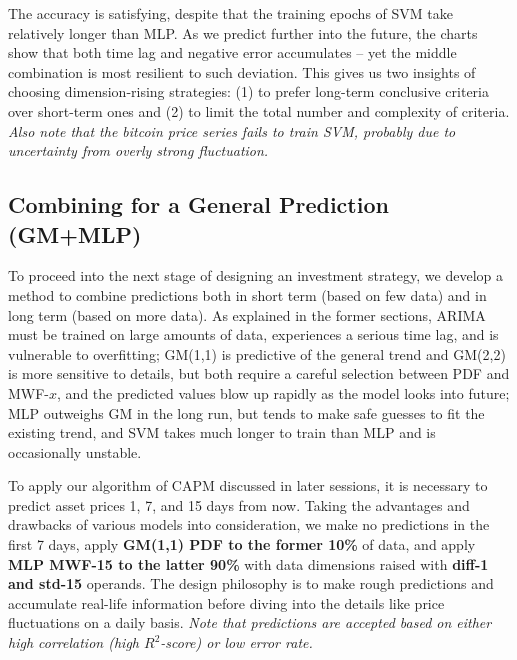 \documentclass{mcmthesis}
\begin{document}
	The accuracy is satisfying, despite that the training epochs of SVM take relatively longer than MLP. As we predict further into the future, the charts show that both time lag and negative error accumulates -- yet the middle combination is most resilient to such deviation. This gives us two insights of choosing dimension-rising strategies: (1) to prefer long-term conclusive criteria over short-term ones and (2) to limit the total number and complexity of criteria. \textit{Also note that the bitcoin price series fails to train SVM, probably due to uncertainty from overly strong fluctuation. }
	
	\subsection{Combining for a General Prediction (GM+MLP)}
	\label{sec:3.4}
	
	To proceed into the next stage of designing an investment strategy, we develop a method to combine predictions both in short term (based on few data) and in long term (based on more data). As explained in the former sections, ARIMA must be trained on large amounts of data, experiences a serious time lag, and is vulnerable to overfitting; GM(1,1) is predictive of the general trend and GM(2,2) is more sensitive to details, but both require a careful selection between PDF and MWF-$x$, and the predicted values blow up rapidly as the model looks into future; MLP outweighs GM in the long run, but tends to make safe guesses to fit the existing trend, and SVM takes much longer to train than MLP and is occasionally unstable. 
	
	To apply our algorithm of CAPM discussed in later sessions, it is necessary to predict asset prices 1, 7, and 15 days from now. Taking the advantages and drawbacks of various models into consideration, we make no predictions in the first 7 days, apply \textbf{GM(1,1) PDF to the former 10\%} of data, and apply \textbf{MLP MWF-15 to the latter 90\%} with data dimensions raised with \textbf{diff-1 and std-15} operands. The design philosophy is to make rough predictions and accumulate real-life information before diving into the details like price fluctuations on a daily basis. \textit{Note that predictions are accepted based on either high correlation (high $R^2$-score) or low error rate. }
	
\end{document}
